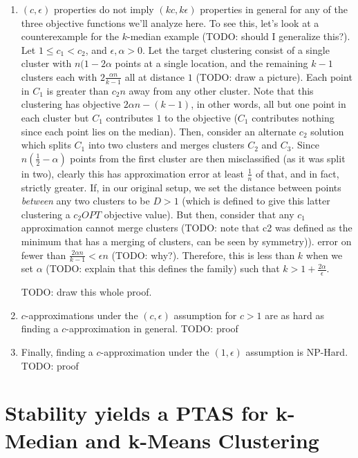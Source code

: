 \documentclass[paper=a4, fontsize=11pt]{scrartcl} %
\numberwithin{equation}{section} %
\numberwithin{figure}{section} %
\numberwithin{table}{section} %
\begin{document}
\begin{enumerate}
\item $(c, \epsilon)$ properties do not imply $(kc, k\epsilon)$ properties in general for any of the three objective functions we'll analyze here.  To see this, let's look at a counterexample for the $k$-median example (TODO: should I generalize this?).  Let $1 \leq c_1 < c_2 $, and $\epsilon, \alpha > 0$.  Let the target clustering consist of a single cluster with $n(1 - 2\alpha$ points at a single location, and the remaining $k-1$ clusters each with $2\frac{\alpha n}{k-1}$ all at distance $1$ (TODO: draw a picture).  Each point in $C_1$ is greater than $c_2 n$ away from any other cluster.  Note that this clustering has objective $2\alpha n - (k - 1)$, in other words, all but one point in each cluster but $C_1$ contributes $1$ to the objective ($C_1$ contributes nothing since each point lies on the median).  Then, consider an alternate $c_2$ solution which splits $C_1$ into two clusters and merges clusters $C_2$ and $C_3$.  Since $n(\frac{1}{2} - \alpha)$ points from the first cluster are then misclassified (as it was split in two), clearly this has approximation error at least 
$\frac{1}{n}$ of that, and in fact, strictly greater.  If, in our original setup, we set the distance between points \emph{between} any two clusters to be $D > 1$ (which is defined to give this latter clustering a $c_2 OPT$ objective value).  But then, consider that any $c_1$ approximation cannot merge clusters (TODO: note that c2 was defined as the minimum that has a merging of clusters, can be seen by symmetry)).  error on fewer than $\frac{2\alpha n}{k-1} < \epsilon n$ (TODO: why?). Therefore, this is less than $k$ when we set $\alpha$ (TODO: explain that this defines the family) such that $k > 1 + \frac{2\alpha}{\epsilon} $.

TODO: draw this whole proof.



\item $c$-approximations under the $(c, \epsilon)$ assumption for $c > 1$ are as hard as finding a $c$-approximation in general. TODO: proof

\item Finally, finding a $c$-approximation under the $(1, \epsilon)$ assumption is NP-Hard. TODO: proof

\end{enumerate}

\section{Stability yields a PTAS for k-Median and k-Means Clustering}
\end{document}
